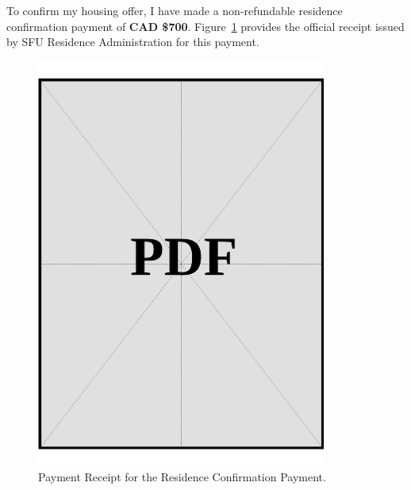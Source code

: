 \noindent
To confirm my housing offer, I have made a non-refundable residence confirmation payment of \textbf{CAD \$700}. Figure~\ref{fig:residence-payment-receipt} provides the official receipt issued by SFU Residence Administration for this payment.

\vspace*{\fill}
\begin{figure}[h!]
    \centering
    \includegraphics[page=1,width=0.85\textwidth]{../docs/applicant/proof-of-housing-arrangement/payment-receipt.pdf}
    \caption{Payment Receipt for the Residence Confirmation Payment.}
    \label{fig:residence-payment-receipt}
\end{figure}
\vspace*{\fill}
\clearpage
